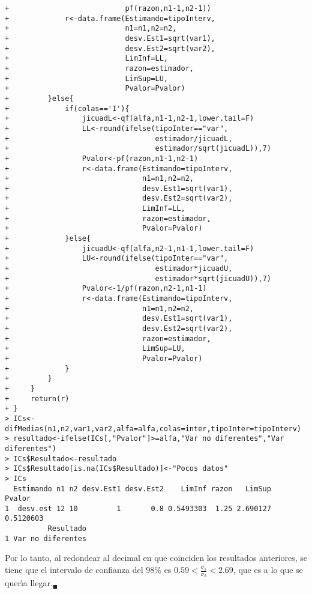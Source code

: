 \begin{solucion}
\begin{verbatim}
+                           pf(razon,n1-1,n2-1))
+             r<-data.frame(Estimando=tipoInterv,
+                           n1=n1,n2=n2,
+                           desv.Est1=sqrt(var1),
+                           desv.Est2=sqrt(var2),
+                           LimInf=LL,
+                           razon=estimador,
+                           LimSup=LU,
+                           Pvalor=Pvalor)
+         }else{
+             if(colas=='I'){
+                 jicuadL<-qf(alfa,n1-1,n2-1,lower.tail=F)
+                 LL<-round(ifelse(tipoInter=="var",
+                                  estimador/jicuadL,
+                                  estimador/sqrt(jicuadL)),7)
+                 Pvalor<-pf(razon,n1-1,n2-1)
+                 r<-data.frame(Estimando=tipoInterv,
+                               n1=n1,n2=n2,
+                               desv.Est1=sqrt(var1),
+                               desv.Est2=sqrt(var2),
+                               LimInf=LL,
+                               razon=estimador,
+                               Pvalor=Pvalor)
+             }else{
+                 jicuadU<-qf(alfa,n2-1,n1-1,lower.tail=F)
+                 LU<-round(ifelse(tipoInter=="var",
+                                  estimador*jicuadU,
+                                  estimador*sqrt(jicuadU)),7)
+                 Pvalor<-1/pf(razon,n2-1,n1-1)
+                 r<-data.frame(Estimando=tipoInterv,
+                               n1=n1,n2=n2,
+                               desv.Est1=sqrt(var1),
+                               desv.Est2=sqrt(var2),
+                               razon=estimador,
+                               LimSup=LU,
+                               Pvalor=Pvalor)
+             }
+         }
+     }
+     return(r)
+ }
> ICs<-difMedias(n1,n2,var1,var2,alfa=alfa,colas=inter,tipoInter=tipoInterv)
> resultado<-ifelse(ICs[,"Pvalor"]>=alfa,"Var no diferentes","Var diferentes")
> ICs$Resultado<-resultado
> ICs$Resultado[is.na(ICs$Resultado)]<-"Pocos datos"
> ICs
  Estimando n1 n2 desv.Est1 desv.Est2    LimInf razon   LimSup    Pvalor
1  desv.est 12 10         1       0.8 0.5493303  1.25 2.690127 0.5120603
          Resultado
1 Var no diferentes
 \end{verbatim}
 \vspace{-0.5cm}
 Por lo tanto, al redondear al decimal en que coinciden los resultados anteriores, se tiene que el intervalo de confianza del $98\%$ es $0.59 < \frac{\sigma_1}{\sigma_2} < 2.69$, que es a lo que se quer\'{\i}a llegar.${}_{\blacksquare}$
\end{solucion}
